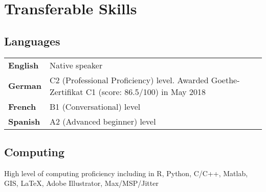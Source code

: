 \section*{Transferable Skills}

\subsection*{Languages}

\begin{center}
\begin{tabular}{ l l }
\textbf{English}  & Native speaker\\ 
\textbf{German} & C2 (Professional Proficiency) level. Awarded Goethe-Zertifikat C1 (score: 86.5/100) in May 2018\\ 
\textbf{French}  & B1 (Conversational) level\\ 
\textbf{Spanish}  & A2 (Advanced beginner) level\\ 
\end{tabular}
\end{center}

\subsection*{Computing}

\noindent High level of computing proficiency including in R, Python, C/C++, Matlab, GIS, \LaTeX, Adobe Illustrator, Max/MSP/Jitter



